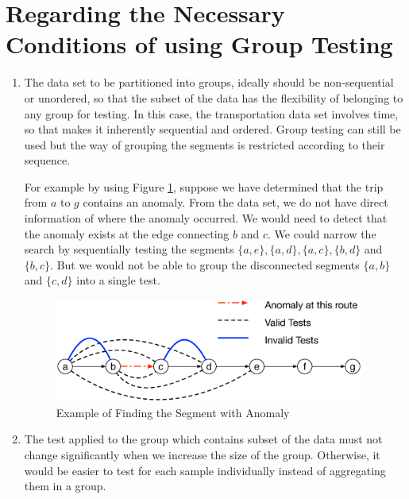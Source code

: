 \documentclass[10pt]{article}
\begin{document}
\section{Regarding the Necessary Conditions of using Group Testing}


\begin{enumerate}
\item The data set to be partitioned into groups, ideally should be non-sequential or unordered, so that the subset of the data has the flexibility of belonging to any group for testing. In this case, the transportation data set involves time, so that makes it inherently sequential and ordered. Group testing can still be used but the way of grouping the segments is restricted according to their sequence.

For example by using Figure \ref{fig:group_testing_example}, suppose we have determined that the trip from $a$ to $g$ contains an anomaly. From the data set, we do not have direct information of where the anomaly occurred. We would need to detect that the anomaly exists at the edge connecting $b$ and $c$. We could narrow the search by sequentially testing the segments $\{a, e\}, \{a, d\}, \{a, c\}, \{b, d\}$ and $\{b, c\}$. But we would not be able to group the disconnected segments $\{a, b\}$ and $\{c, d\}$ into a single test.

\begin{figure}[htb]
	\centering
	\includegraphics[width=4.0in]{group_testing_example}
	\caption{Example of Finding the Segment with Anomaly}
	\label{fig:group_testing_example}
\end{figure}

\item The test applied to the group which contains subset of the data must not change significantly when we increase the size of the group. Otherwise, it would be easier to test for each sample individually instead of aggregating them in a group.
\end{enumerate}
\end{document}

